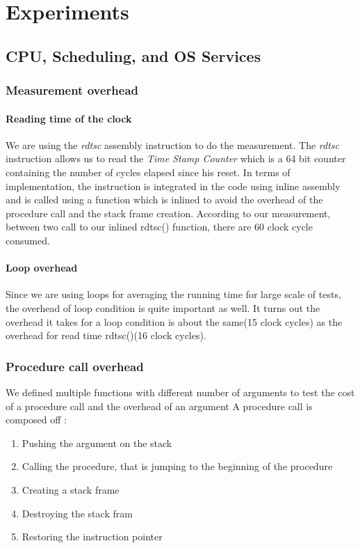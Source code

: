 \section{Experiments}



\subsection{CPU, Scheduling, and OS Services}

\subsubsection{Measurement overhead}

\paragraph{Reading time of the clock}
We are using the \emph{rdtsc} assembly instruction to do the measurement.
The \emph{rdtsc} instruction allows us to read the \emph{Time Stamp Counter}
which is a 64 bit counter containing the number of cycles elapsed since his
reset.
In terms of implementation, the instruction is integrated in the code using
inline assembly and is called using a function which is inlined to avoid the
overhead of the procedure call and the stack frame creation.
According to our measurement, between two call to our inlined rdtsc() function,
there are 60 clock cycle consumed.

\paragraph{Loop overhead}
Since we are using loops for averaging the running time for large scale of tests, the overhead of loop condition is quite important as well. It turns out the overhead it takes for a loop condition is about the same(15 clock cycles) as the overhead for read time rdtsc()(16 clock cycles).

\subsubsection{Procedure call overhead}
We defined multiple functions with different number of arguments to test the
cost of a procedure call and the overhead of an argument
A procedure call is composed off :
\begin{enumerate}
\item Pushing the argument on the stack
\item Calling the procedure, that is jumping to the beginning of the procedure
\item Creating a stack frame
\item Destroying the stack fram
\item Restoring the instruction pointer
\end{enumerate}


